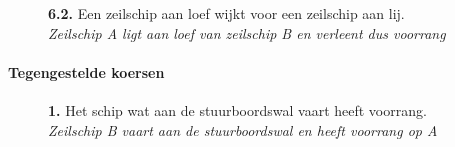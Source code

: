 \vspace{-0.7cm}
\begin{figure}[H]
	\centering
	\hspace{0.02\textwidth}
	\begin{minipage}[t]{0.70\textwidth}
		\textbf{6.2.} Een zeilschip aan loef wijkt voor een zeilschip aan lij.\\
		\textit{Zeilschip A ligt aan loef van zeilschip B en verleent dus voorrang}
	\end{minipage}
	\hfill
	\begin{minipage}[t]{0.20\textwidth}
		\label{pic:kr42}
	\end{minipage}
	\hfill
\end{figure}


\paragraph{Tegengestelde koersen}
\vspace{-0.2cm}
\begin{figure}[H]
	\centering
	\begin{minipage}[t]{0.70\textwidth}
		\textbf{1.} Het schip wat aan de stuurboordswal vaart heeft voorrang.\\
		\textit{Zeilschip B vaart aan de stuurboordswal en heeft voorrang op A}
	\end{minipage}
	\hfill
	\begin{minipage}[t]{0.25\textwidth}
		\label{pic:tg1}
	\end{minipage}
	\hfill
\end{figure}
\vspace{-0.7cm}

